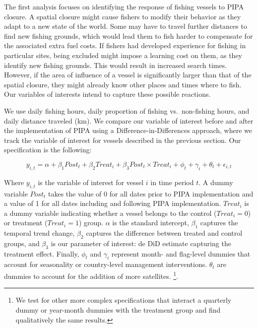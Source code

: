 \documentclass[11pt,]{article}
\let\rmarkdownfootnote\footnote%
\def\footnote{\protect\rmarkdownfootnote}
\begin{document}
The first analysis focuses on identifying the response of fishing
vessels to PIPA closure. A spatial closure might cause fishers to modify
their behavior as they adapt to a new state of the world. Some may have
to travel further distances to find new fishing grounds, which would
lead them to fish harder to compensate for the associated extra fuel
costs. If fishers had developed experience for fishing in particular
sites, being excluded might impose a learning cost on them, as they
identify new fishing grounds. This would result in increased search
times. However, if the area of influence of a vessel is significantly
larger than that of the spatial closure, they might already know other
places and times where to fish. Our variables of interests intend to
capture these possible reactions.

We use daily fishing hours, daily proportion of fishing vs.~non-fishing
hours, and daily distance traveled (km). We compare our variable of
interest before and after the implementation of PIPA using a
Difference-in-Differences approach, where we track the variable of
interest for vessels described in the previous section. Our
specification is the following:

\[
y_{i,t} = \alpha + \beta_1 Post_t + \beta_2 Treat_i + \beta_3 Post_t \times Treat_i + \phi_t + \gamma_i + \theta_t + \epsilon_{i,t}
\]

Where \(y_{i,t}\) is the variable of interest for vessel \(i\) in time
period \(t\). A dummy variable \(Post_t\) takes the value of 0 for all
dates prior to PIPA implementation and a value of 1 for all dates
including and following PIPA implementation. \(Treat_i\) is a dummy
variable indicating whether a vessel belongs to the control
(\(Treat_i = 0\)) or treatment (\(Treat_i = 1\)) group. \(\alpha\) is
the standard intercept, \(\beta_1\) captures the temporal trend change,
\(\beta_2\) captures the difference between treated and control groups,
and \(\beta_3\) is our parameter of interest: de DiD estimate capturing
the treatment effect. Finally, \(\phi_t\) and \(\gamma_i\) represent
month- and flag-level dummies that account for seasonality or
country-level management interventions. \(\theta_t\) are dummies to
account for the addition of more satellites.
\footnote{We test for other more complex specifications that interact a quarterly dummy or year-month dummies with the treatment group and find qualitatively the same results.}.
\end{document}
